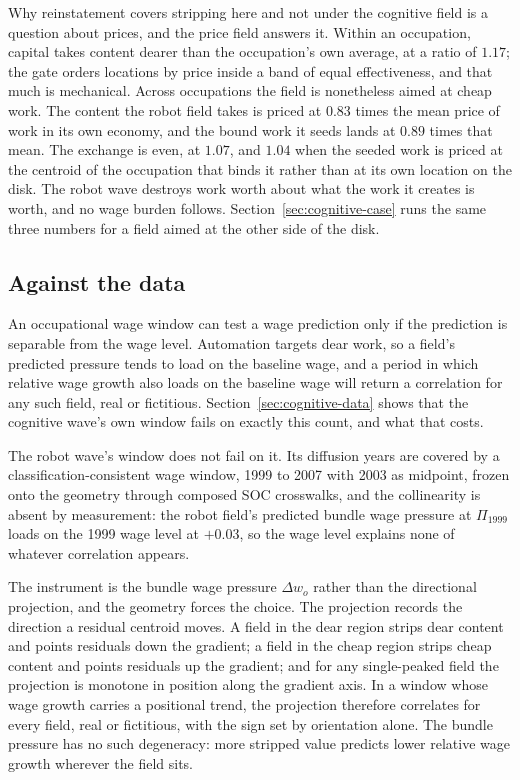 \documentclass[12pt, a4paper]{article}
\begin{document}
Why reinstatement covers stripping here and not under the cognitive
field is a question about prices, and the price field answers it. Within
an occupation, capital takes content dearer than the occupation's own
average, at a ratio of $1.17$; the gate orders locations by price inside
a band of equal effectiveness, and that much is mechanical. Across
occupations the field is nonetheless aimed at cheap work. The content
the robot field takes is priced at $0.83$ times the mean price of work in
its own economy, and the bound work it seeds lands at $0.89$ times that
mean. The exchange is even, at $1.07$, and $1.04$ when the seeded work is
priced at the centroid of the occupation that binds it rather than at its
own location on the disk. The robot wave destroys work worth about what
the work it creates is worth, and no wage burden follows.
Section~\ref{sec:cognitive-case} runs the same three numbers for a field
aimed at the other side of the disk.

\subsection{Against the data}
\label{sec:robot-data}
\label{sec:check-robot-wage}

An occupational wage window can test a wage prediction only if the
prediction is separable from the wage level. Automation targets dear
work, so a field's predicted pressure tends to load on the baseline wage,
and a period in which relative wage growth also loads on the baseline
wage will return a correlation for any such field, real or fictitious.
Section~\ref{sec:cognitive-data} shows that the cognitive wave's own
window fails on exactly this count, and what that costs.

The robot wave's window does not fail on it. Its diffusion years are
covered by a classification-consistent wage window, 1999 to 2007 with
2003 as midpoint, frozen onto the geometry through composed SOC
crosswalks, and the collinearity is absent by measurement: the robot
field's predicted bundle wage pressure at $\Pi_{1999}$ loads on the 1999
wage level at $+0.03$, so the wage level explains none of whatever
correlation appears.

The instrument is the bundle wage pressure $\Delta w_o$ rather than the
directional projection, and the geometry forces the choice. The
projection records the direction a residual centroid moves. A field in
the dear region strips dear content and points residuals down the
gradient; a field in the cheap region strips cheap content and points
residuals up the gradient; and for any single-peaked field the
projection is monotone in position along the gradient axis. In a window
whose wage growth carries a positional trend, the projection therefore
correlates for every field, real or fictitious, with the sign set by
orientation alone. The bundle pressure has no such degeneracy: more
stripped value predicts lower relative wage growth wherever the field
sits.
\end{document}
